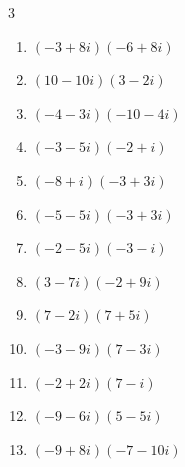 \begin{multicols}{3}
\begin{enumerate}
\columnbreak %

  \item $\displaystyle (-3+8i)(-6+8i)$

        \phantom{$\displaystyle =-46-72i$}

  \item $\displaystyle (10-10i)(3-2i)$

        \phantom{$\displaystyle =10-50i$}

  \item $\displaystyle (-4-3i)(-10-4i)$

        \phantom{$\displaystyle =28+46i$}

  \item $\displaystyle (-3-5i)(-2+i)$

        \phantom{$\displaystyle =11+7i$}

  \item $\displaystyle (-8+i)(-3+3i)$

        \phantom{$\displaystyle =21-27i$}

  \item $\displaystyle (-5-5i)(-3+3i)$

        \phantom{$\displaystyle =30$}

  \item $\displaystyle (-2-5i)(-3-i)$

        \phantom{$\displaystyle =1+17i$}

  \item $\displaystyle (3-7i)(-2+9i)$

        \phantom{$\displaystyle =57+41i$}

  \item $\displaystyle (7-2i)(7+5i)$

        \phantom{$\displaystyle =59+21i$}

  \item $\displaystyle (-3-9i)(7-3i)$

        \phantom{$\displaystyle =-48-54i$}

  \item $\displaystyle (-2+2i)(7-i)$

        \phantom{$\displaystyle =-12+16i$}

  \item $\displaystyle (-9-6i)(5-5i)$

        \phantom{$\displaystyle =-75+15i$}

  \item $\displaystyle (-9+8i)(-7-10i)$


\end{enumerate}
\end{multicols}
